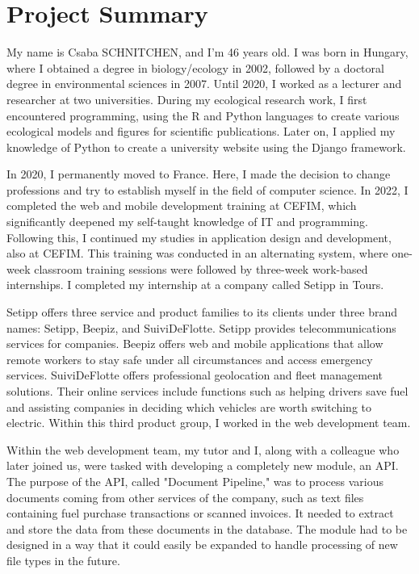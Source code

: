 \chapter{Project Summary}\label{ch:project-summary}


My name is Csaba SCHNITCHEN, and I'm 46 years old. I was born in Hungary, where I obtained a degree in biology/ecology in 2002, followed by a doctoral degree in environmental sciences in 2007. Until 2020, I worked as a lecturer and researcher at two universities. During my ecological research work, I first encountered programming, using the R and Python languages to create various ecological models and figures for scientific publications. Later on, I applied my knowledge of Python to create a university website using the Django framework.

In 2020, I permanently moved to France. Here, I made the decision to change professions and try to establish myself in the field of computer science. In 2022, I completed the web and mobile development training at CEFIM, which significantly deepened my self-taught knowledge of IT and programming. Following this, I continued my studies in application design and development, also at CEFIM. This training was conducted in an alternating system, where one-week classroom training sessions were followed by three-week work-based internships. I completed my internship at a company called Setipp in Tours.

Setipp offers three service and product families to its clients under three brand names: Setipp, Beepiz, and SuiviDeFlotte. Setipp provides telecommunications services for companies. Beepiz offers web and mobile applications that allow remote workers to stay safe under all circumstances and access emergency services. SuiviDeFlotte offers professional geolocation and fleet management solutions. Their online services include functions such as helping drivers save fuel and assisting companies in deciding which vehicles are worth switching to electric. Within this third product group, I worked in the web development team.

Within the web development team, my tutor and I, along with a colleague who later joined us, were tasked with developing a completely new module, an API. The purpose of the API, called "Document Pipeline," was to process various documents coming from other services of the company, such as text files containing fuel purchase transactions or scanned invoices. It needed to extract and store the data from these documents in the database. The module had to be designed in a way that it could easily be expanded to handle processing of new file types in the future.

